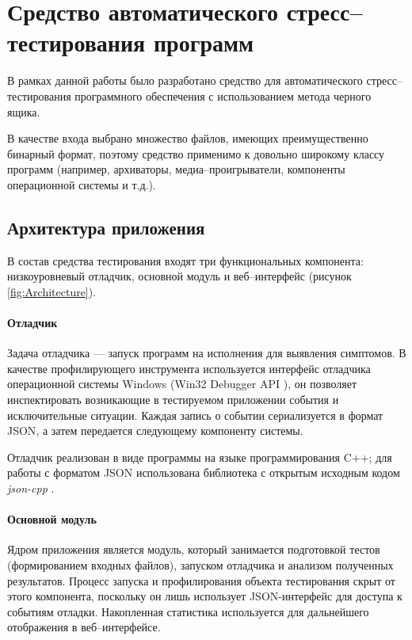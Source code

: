 \documentclass[a4paper,14pt,href]{article}
\begin{document}
\section{Средство автоматического стресс--тес\-ти\-ро\-ва\-ния программ}
	В рамках данной работы было разработано средство для автоматического стресс--тестирования программного обеспечения с использованием метода черного ящика.

	В качестве входа выбрано множество файлов, имеющих преимущественно бинарный формат, поэтому средство применимо к довольно широкому классу программ (например, архиваторы, медиа--проигрыватели, компоненты операционной системы и т.д.).

\subsection{Архитектура приложения}
	В состав средства тестирования входят три функциональных компонента: низкоуровневый отладчик, основной модуль и веб--интерфейс (рисунок \ref{fig:Architecture}).

\paragraph{Отладчик} Задача отладчика --- запуск программ на исполнения для выявления симптомов. В качестве профилирующего инструмента используется интерфейс отладчика операционной системы Windows (Win32 De\-bugger API \cite{win32debugger}), он позволяет инспектировать возникающие в тестируемом приложении события и исключительные ситуации. Каждая запись о событии сериализуется в формат JSON\cite{json}, а затем передается следующему компоненту системы.

Отладчик реализован в виде программы на языке программирования C++; для работы с форматом JSON использована библиотека с открытым исходным кодом \textit{json-cpp} \cite{jsoncpp}.

\paragraph{Основной модуль} Ядром приложения является модуль, который занимается подготовкой тестов (формированием входных файлов), запуском отладчика и анализом полученных результатов. Процесс запуска и профилирования объекта тестирования скрыт от этого компонента, поскольку он лишь использует JSON-интерфейс для доступа к событиям отладки. Накопленная статистика используется для дальнейшего отображения в веб--интерфейсе.
\end{document}
